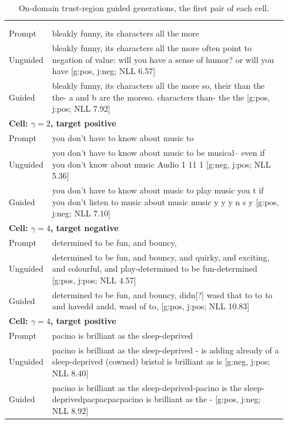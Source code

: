 {\footnotesize
\begin{longtable}{p{0.11\linewidth} p{0.83\linewidth}}
\caption[On-domain trust-region guided generations.]{On-domain trust-region guided generations, the first pair of each cell.}\label{tab:gprime-examples}\\
\toprule
& \\
\endfirsthead
\toprule & \\ \endhead
\bottomrule \endfoot
\midrule
\multicolumn{2}{l}{\textbf{Cell: $\gamma=2$, target negative}} \\ \midrule
Prompt & bleakly funny, its characters all the more \\
Unguided & bleakly funny, its characters all the more often point to negation of value: will you have a sense of humor? or will you have  {\scriptsize [g:pos, j:neg; NLL 6.57]} \\
Guided & bleakly funny, its characters all the more so, their than the the- a and b are the moreso. characters than- the the  {\scriptsize [g:pos, j:pos; NLL 7.92]} \\
\midrule
\multicolumn{2}{l}{\textbf{Cell: $\gamma=2$, target positive}} \\ \midrule
Prompt & you don't have to know about music to \\
Unguided & you don't have to know about music to be musical-- even if you don't know about music  Audio  1 11 1  {\scriptsize [g:neg, j:pos; NLL 5.36]} \\
Guided & you don't have to know about music to play music you t if you don't listen to music about music music y y y n s y  {\scriptsize [g:pos, j:neg; NLL 7.10]} \\
\midrule
\multicolumn{2}{l}{\textbf{Cell: $\gamma=4$, target negative}} \\ \midrule
Prompt & determined to be fun, and bouncy, \\
Unguided & determined to be fun, and bouncy, and quirky, and exciting, and colourful, and play-determined to be fun-determined  {\scriptsize [g:pos, j:pos; NLL 4.57]} \\
Guided & determined to be fun, and bouncy, didn[?] wasd that to to to and havedd andd, wasd of to,  {\scriptsize [g:pos, j:pos; NLL 10.83]} \\
\midrule
\multicolumn{2}{l}{\textbf{Cell: $\gamma=4$, target positive}} \\ \midrule
Prompt & pacino is brilliant as the sleep-deprived \\
Unguided & pacino is brilliant as the sleep-deprived - is adding already of a sleep-deprived (cowned) bristol is brilliant as is  {\scriptsize [g:neg, j:pos; NLL 8.40]} \\
Guided & pacino is brilliant as the sleep-deprived-pacino is the sleep-deprivedpacpacpacpacino is brilliant as the -  {\scriptsize [g:pos, j:neg; NLL 8.92]} \\
\end{longtable}}

